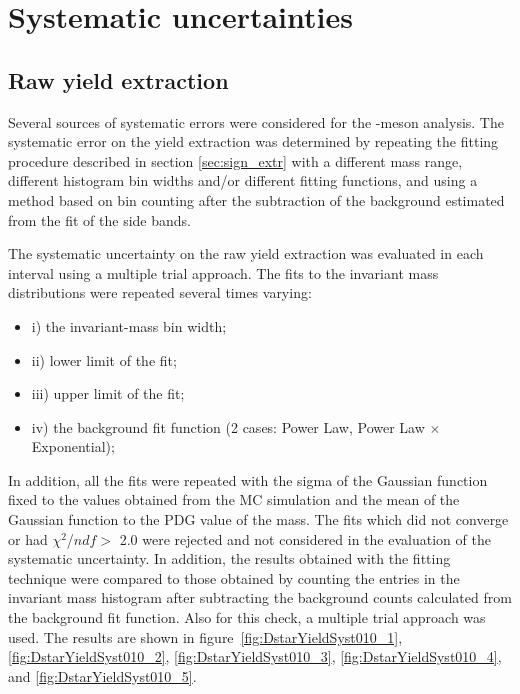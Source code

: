 \clearpage
\section{Systematic uncertainties}

\subsection{Raw yield extraction}
\label{sec:raw_yield_syst}
Several sources of systematic errors were considered for the \Dstar -meson analysis. The systematic error on the yield extraction was determined by repeating the fitting procedure described in section \ref{sec:sign_extr} with a different mass range, different histogram bin widths and/or different fitting functions, and using a method based on bin counting after the subtraction of the background estimated from the fit of the side bands.%

The systematic uncertainty on the raw yield extraction was evaluated in each \pt interval using a multiple trial approach. The fits to the invariant mass distributions were repeated several times varying:
\begin{itemize}
	\item i) the invariant-mass bin width;
	\item ii) lower limit of the fit;
	\item iii) upper  limit  of  the  fit;
	\item iv) the background fit function (2 cases: Power Law, Power Law $\times$ Exponential);
\end{itemize}   
In addition, all the fits were repeated with the sigma of the Gaussian function fixed to the values obtained from the MC simulation and the mean of the Gaussian function to the PDG value of the \Dstar mass. The fits which did not converge or had $\chi^2$/$ndf> $ 2.0 were rejected and not considered in the evaluation of the systematic uncertainty.  In addition, the results obtained with the fitting technique were compared to those obtained by counting the entries in the invariant mass histogram after subtracting the background counts calculated from the background fit function. Also for this check, a multiple trial approach was used. 
The results are shown in figure~\ref{fig:DstarYieldSyst010_1}, \ref{fig:DstarYieldSyst010_2}, \ref{fig:DstarYieldSyst010_3}, \ref{fig:DstarYieldSyst010_4}, and \ref{fig:DstarYieldSyst010_5}. %



